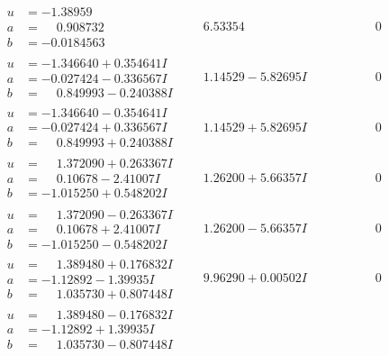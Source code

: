 \documentclass[1p]{elsarticle_modified}
\theoremstyle{definition}
\begin{document}
$$\begin{array}{c|c|c}
\begin{aligned}
u &= -1.38959\phantom{ +0.000000I} \\
a &= \phantom{-}0.908732\phantom{ +0.000000I} \\
b &= -0.0184563\phantom{ +0.000000I}\end{aligned}
 & \phantom{-}6.53354\phantom{ +0.000000I} & \phantom{-0.000000 } 0 \\ \hline\begin{aligned}
u &= -1.346640 + 0.354641 I \\
a &= -0.027424 - 0.336567 I \\
b &= \phantom{-}0.849993 - 0.240388 I\end{aligned}
 & \phantom{-}1.14529 - 5.82695 I & \phantom{-0.000000 } 0 \\ \hline\begin{aligned}
u &= -1.346640 - 0.354641 I \\
a &= -0.027424 + 0.336567 I \\
b &= \phantom{-}0.849993 + 0.240388 I\end{aligned}
 & \phantom{-}1.14529 + 5.82695 I & \phantom{-0.000000 } 0 \\ \hline\begin{aligned}
u &= \phantom{-}1.372090 + 0.263367 I \\
a &= \phantom{-}0.10678 - 2.41007 I \\
b &= -1.015250 + 0.548202 I\end{aligned}
 & \phantom{-}1.26200 + 5.66357 I & \phantom{-0.000000 } 0 \\ \hline\begin{aligned}
u &= \phantom{-}1.372090 - 0.263367 I \\
a &= \phantom{-}0.10678 + 2.41007 I \\
b &= -1.015250 - 0.548202 I\end{aligned}
 & \phantom{-}1.26200 - 5.66357 I & \phantom{-0.000000 } 0 \\ \hline\begin{aligned}
u &= \phantom{-}1.389480 + 0.176832 I \\
a &= -1.12892 - 1.39935 I \\
b &= \phantom{-}1.035730 + 0.807448 I\end{aligned}
 & \phantom{-}9.96290 + 0.00502 I & \phantom{-0.000000 } 0 \\ \hline\begin{aligned}
u &= \phantom{-}1.389480 - 0.176832 I \\
a &= -1.12892 + 1.39935 I \\
b &= \phantom{-}1.035730 - 0.807448 I\end{aligned}

\end{array}$$
\end{document}

